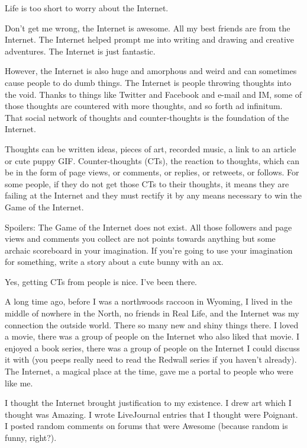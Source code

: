 
Life is too short to worry about the Internet.

Don't get me wrong, the Internet is awesome. All my best friends are from the Internet. The Internet helped prompt me into writing and drawing and creative adventures. The Internet is just fantastic.

However, the Internet is also huge and amorphous and weird and can sometimes cause people to do dumb things. The Internet is people throwing thoughts into the void. Thanks to things like Twitter and Facebook and e-mail and IM, some of those thoughts are countered with more thoughts, and so forth ad infinitum. That social network of thoughts and counter-thoughts is the foundation of the Internet.

Thoughts can be written ideas, pieces of art, recorded music, a link to an article or cute puppy GIF. Counter-thoughts (CTs), the reaction to thoughts, which can be in the form of page views, or comments, or replies, or retweets, or follows. For some people, if they do not get those CTs to their thoughts, it means they are failing at the Internet and they must rectify it by any means necessary to win the Game of the Internet.

Spoilers: The Game of the Internet does not exist. All those followers and page views and comments you collect are not points towards anything but some archaic scoreboard in your imagination. If you're going to use your imagination for something, write a story about a cute bunny with an ax.

Yes, getting CTs from people is nice. I've been there.

A long time ago, before I was a northwoods raccoon in Wyoming,  I lived in the middle of nowhere in the North, no friends in Real Life, and the Internet was my connection the outside world. There so many new and shiny things there. I loved a movie, there was a group of people on the Internet who also liked that movie. I enjoyed a book series, there was a group of people on the Internet I could discuss it with (you peeps really need to read the Redwall series if you haven't already). The Internet, a magical place at the time, gave me a portal to people who were like me.

I thought the Internet brought justification to my existence.  I drew art which I thought was Amazing. I wrote LiveJournal entries that I thought were Poignant. I posted random comments on forums that were Awesome (because random is funny, right?).

